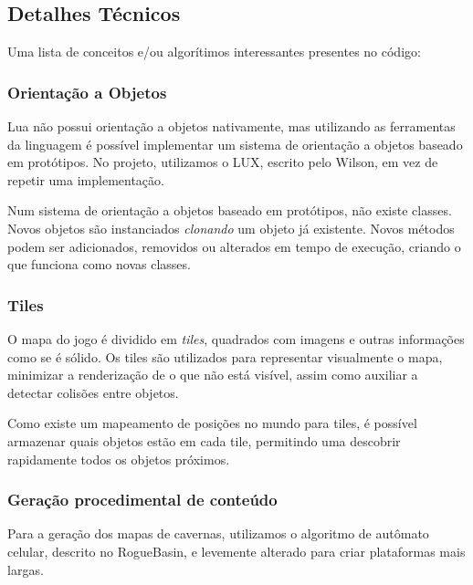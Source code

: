   \subsection{Detalhes Técnicos}
    Uma lista de conceitos e/ou algorítimos interessantes presentes no código:
    
    \subsubsection{Orientação a Objetos}
      Lua não possui orientação a objetos nativamente, mas utilizando as ferramentas da linguagem é possível
      implementar um sistema de orientação a objetos baseado em protótipos.
      No projeto, utilizamos o LUX\footnotemark{}, escrito pelo Wilson, em vez de repetir uma implementação.
      
      Num sistema de orientação a objetos baseado em protótipos, não existe classes. Novos objetos são instanciados
      \textit{clonando} um objeto já existente. Novos métodos podem ser adicionados, removidos ou alterados em
      tempo de execução, criando o que funciona como novas classes.
      
      
    \subsubsection{Tiles}
      O mapa do jogo é dividido em \textit{tiles}, quadrados com imagens e outras informações como se é sólido.
      Os tiles são utilizados para representar visualmente o mapa, minimizar a renderização de o que não está
      visível, assim como auxiliar a detectar colisões entre objetos.
      
      Como existe um mapeamento de posições no mundo para tiles, é possível armazenar quais objetos estão em cada
      tile, permitindo uma descobrir rapidamente todos os objetos próximos.
    
    \subsubsection{Geração procedimental de conteúdo}
      Para a geração dos mapas de cavernas, utilizamos o algoritmo de autômato celular, descrito no RogueBasin,
      \cite{roguebasin:cellularautomata} e levemente alterado para criar plataformas mais largas.
      
